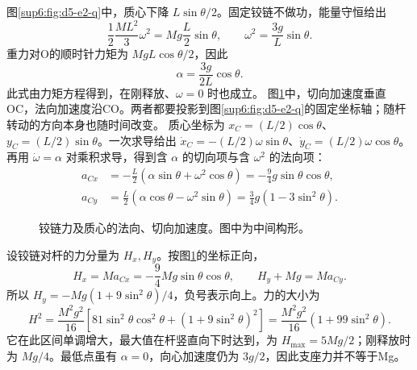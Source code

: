 \begin{solution}
图\ref{sup6:fig:d5-e2-q}中，质心下降 $L\sin\theta/2$。固定铰链不做功，能量守恒给出
\[
\frac12\frac{ML^2}{3}\omega^2=Mg\frac L2\sin\theta,
\qquad \omega^2=\frac{3g}L\sin\theta.
\]
重力对O的顺时针力矩为 $MgL\cos\theta/2$，因此
\[
\alpha=\frac{3g}{2L}\cos\theta.
\]
此式由力矩方程得到，在刚释放、$\omega=0$ 时也成立。
图\ref{sup6:fig:d5-e2-s}中，切向加速度垂直OC，法向加速度沿CO。两者都要投影到图\ref{sup6:fig:d5-e2-q}的固定坐标轴；随杆转动的方向本身也随时间改变。
质心坐标为 $x_C=(L/2)\cos\theta$、$y_C=(L/2)\sin\theta$。一次求导给出 $\dot x_C=-(L/2)\omega\sin\theta$、$\dot y_C=(L/2)\omega\cos\theta$。再用 $\dot\omega=\alpha$ 对乘积求导，得到含 $\alpha$ 的切向项与含 $\omega^2$ 的法向项：
\[
\begin{aligned}
a_{Cx}&=-\frac L2(\alpha\sin\theta+\omega^2\cos\theta)
=-\frac94g\sin\theta\cos\theta,\\
a_{Cy}&=\frac L2(\alpha\cos\theta-\omega^2\sin\theta)
=\frac34g(1-3\sin^2\theta).
\end{aligned}
\]
\begin{figure}[H]\centering
{}
\caption{铰链力及质心的法向、切向加速度。图中为中间构形。}\label{sup6:fig:d5-e2-s}
\end{figure}
设铰链对杆的力分量为 $H_x,H_y$。按图\ref{sup6:fig:d5-e2-s}的坐标正向，
\[
H_x=Ma_{Cx}=-\frac94Mg\sin\theta\cos\theta,
\qquad H_y+Mg=Ma_{Cy}.
\]
所以 $H_y=-Mg(1+9\sin^2\theta)/4$，负号表示向上。力的大小为
\[
H^2=\frac{M^2g^2}{16}
\left[81\sin^2\theta\cos^2\theta+(1+9\sin^2\theta)^2\right]
=\frac{M^2g^2}{16}(1+99\sin^2\theta).
\]
它在此区间单调增大，最大值在杆竖直向下时达到，为 $H_{\max}=5Mg/2$；刚释放时为 $Mg/4$。最低点虽有 $\alpha=0$，向心加速度仍为 $3g/2$，因此支座力并不等于Mg。
\end{solution}



